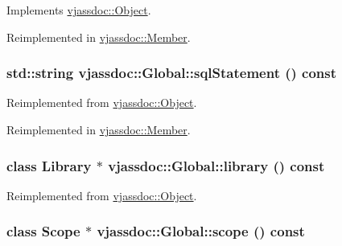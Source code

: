 Implements \hyperlink{classvjassdoc_1_1Object_a0489e38956f3507566b1bc6e3e2c8af}{vjassdoc::Object}.

Reimplemented in \hyperlink{classvjassdoc_1_1Member_2bd66eba1882dfb2dcbf2552b42d1346}{vjassdoc::Member}.\hypertarget{classvjassdoc_1_1Global_4e9a8ea0c8bc34f6980d31676e497531}{
\subsubsection{\setlength{\rightskip}{0pt plus 5cm}std::string vjassdoc::Global::sqlStatement () const}}
\label{classvjassdoc_1_1Global_4e9a8ea0c8bc34f6980d31676e497531}




Reimplemented from \hyperlink{classvjassdoc_1_1Object_4e8ebbb0ce5b0bf91ec847b1e4a9f8fc}{vjassdoc::Object}.

Reimplemented in \hyperlink{classvjassdoc_1_1Member_ad210521f998bd4c8be5f8af3ae74cf1}{vjassdoc::Member}.\hypertarget{classvjassdoc_1_1Global_cbf7be8310f31bd7dc142b290020b4a9}{
\subsubsection{\setlength{\rightskip}{0pt plus 5cm}class {\bf Library} $\ast$ vjassdoc::Global::library () const}}
\label{classvjassdoc_1_1Global_cbf7be8310f31bd7dc142b290020b4a9}




Reimplemented from \hyperlink{classvjassdoc_1_1Object_cc4241505c5bcdd0bbcb08a1b665b3fd}{vjassdoc::Object}.\hypertarget{classvjassdoc_1_1Global_239f8dbfff5e8ed7580d6ba9aadd5f55}{
\subsubsection{\setlength{\rightskip}{0pt plus 5cm}class {\bf Scope} $\ast$ vjassdoc::Global::scope () const}}
\label{classvjassdoc_1_1Global_239f8dbfff5e8ed7580d6ba9aadd5f55}




